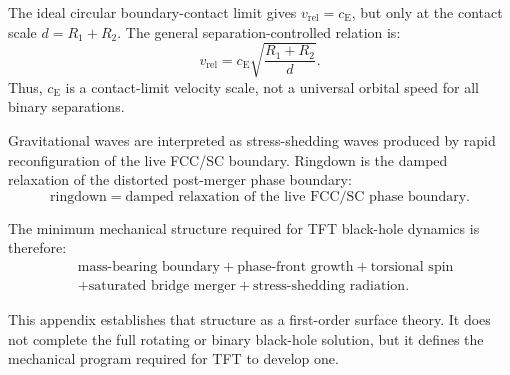 The ideal circular boundary-contact limit gives $v_{\mathrm{rel}} = c_{\mathrm{E}}$, but only at the contact scale $d = R_1 + R_2$. The general separation-controlled relation is:
\begin{equation}
    v_{\mathrm{rel}} = c_{\mathrm{E}} \sqrt{\frac{R_1+R_2}{d}}.
\end{equation}
Thus, $c_{\mathrm{E}}$ is a contact-limit velocity scale, not a universal orbital speed for all binary separations.

Gravitational waves are interpreted as stress-shedding waves produced by rapid reconfiguration of the live FCC/SC boundary. Ringdown is the damped relaxation of the distorted post-merger phase boundary:
\begin{equation}
    \text{ringdown} = \text{damped relaxation of the live FCC/SC phase boundary}.
\end{equation}

The minimum mechanical structure required for TFT black-hole dynamics is therefore:
\begin{equation}
\begin{split}
    &\text{mass-bearing boundary} + \text{phase-front growth} + \text{torsional spin} \\
    &+ \text{saturated bridge merger} + \text{stress-shedding radiation}.
\end{split}
\end{equation}

This appendix establishes that structure as a first-order surface theory. It does not complete the full rotating or binary black-hole solution, but it defines the mechanical program required for TFT to develop one.